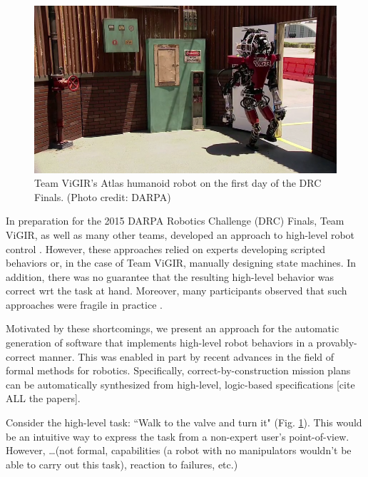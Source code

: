 
\begin{figure}[t]
\centering
\includegraphics[width=0.99\columnwidth,clip]{./img/atlas_door_finals.png}
\caption{Team ViGIR's Atlas humanoid robot on the first day of the DRC Finals. (Photo credit: DARPA)
}
\label{Fig:AtlasDoorFinals}
\end{figure}

In preparation for the 2015 DARPA Robotics Challenge (DRC) Finals, Team ViGIR, as well as many other teams, developed an approach to high-level robot control \cite{Philipp2013Bsc, Philipp2015Msc}.
However, these approaches relied on experts developing scripted behaviors or, in the case of Team ViGIR, manually designing state machines.
In addition, there was no guarantee that the resulting high-level behavior was correct \ac{wrt} the task at hand.
Moreover, many participants observed that such approaches were fragile in practice \cite{DRC-what-happened}.

Motivated by these shortcomings, we present an approach for the automatic generation of software that implements high-level robot behaviors in a provably-correct manner.
This was enabled in part by recent advances in the field of formal methods for robotics.
Specifically, correct-by-construction mission plans can be automatically synthesized from high-level, logic-based specifications [cite ALL the papers].

\begin{myExample}\label{Ex:PickupObject}
	Consider the high-level task: ``Walk to the valve and turn it" (Fig. \ref{Fig:AtlasDoorFinals}).
	This would be an intuitive way to express the task from a non-expert user's point-of-view.
	However, \ldots (not formal, capabilities (a robot with no manipulators wouldn't be able to carry out this task), reaction to failures, etc.)
\end{myExample}

